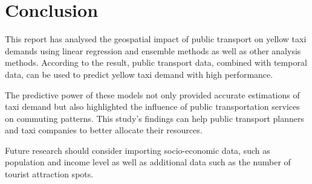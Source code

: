 \documentclass[11pt]{article}
\begin{document}
\section{Conclusion}

This report has analysed the geospatial impact of public transport on yellow taxi demands using linear regression and ensemble methods as well as other analysis methods. According to the result, public transport data, combined with temporal data, can be used to predict yellow taxi demand with high performance.

The predictive power of these models not only provided accurate estimations of taxi demand but also highlighted the influence of public transportation services on commuting patterns. This study's findings can help public transport planners and taxi companies to better allocate their resources. 

Future research should consider importing socio-economic data, such as population and income level as well as additional data such as the number of tourist attraction spots. 

\clearpage

\printbibliography
\end{document}
